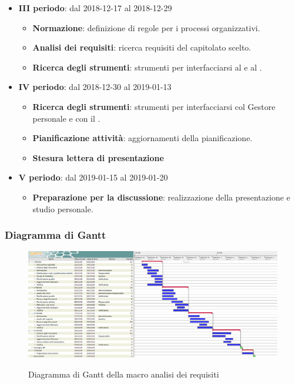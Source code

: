 \begin{itemize}
\begin{itemize}
			\end{itemize}
        	\item \textbf{III periodo}: dal 2018-12-17 al 2018-12-29
			\begin{itemize}
    	        \item \textbf{Normazione}: definizione di regole per i processi organizzativi.
    	        \item \textbf{Analisi dei requisiti}: ricerca requisiti del capitolato scelto.
       	        \item \textbf{Ricerca degli strumenti}: strumenti per interfacciarsi al  e al .
        	\end{itemize}
        	\item \textbf{IV periodo}: dal 2018-12-30 al 2019-01-13
        	\begin{itemize}
       	        \item \textbf{Ricerca degli strumenti}: strumenti per interfacciarsi col Gestore personale e con il .
       	        \item \textbf{Pianificazione attività}: aggiornamenti della pianificazione.
       	        \item \textbf{Stesura lettera di presentazione}
        	\end{itemize}
        	\item \textbf{V periodo}: dal 2019-01-15 al 2019-01-20
        	\begin{itemize}
    	        \item \textbf{Preparazione per la discussione}: realizzazione della presentazione e studio personale.
        	\end{itemize}
		\end{itemize}

        \begin{landscape}
			\subsubsection{Diagramma di Gantt}
			\begin{figure}[H]
					\centering
					\includegraphics[scale=0.4]{img/Analisi_dei_requisiti.png}\\
					\caption{Diagramma di Gantt della macro analisi dei requisiti}
			\end{figure}
		\end{landscape}

